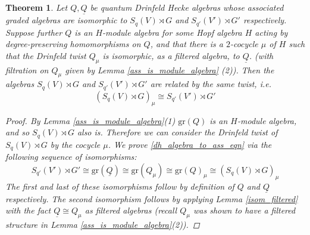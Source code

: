 \documentclass[10pt]{article}
\newcommand{\bb}{\medbreak}
\newcommand{\gr}{\text{gr}}
\newtheorem{theorem}[lemma]{Theorem}
\theoremstyle{definition}
\begin{document}
\begin{theorem}\label{dh_algebra_to_ass} Let $Q,\underline{Q}$ be quantum Drinfeld Hecke algebras whose associated graded algebras are isomorphic to $S_q(V)\rtimes G$ and $S_{q'}(V')\rtimes G'$ respectively. Suppose further $Q$ is an $H$-module algebra for some Hopf algebra $H$ acting by degree-preserving homomorphisms on $Q$, and that there is a $2$-cocycle $\mu$ of $H$ such that the Drinfeld twist $Q_\mu$ is isomorphic, as a filtered algebra, to $\underline{Q}$. (with filtration on $Q_\mu$ given by Lemma \ref{ass_is_module_algebra} (2)). Then the algebras $S_q(V)\rtimes G$ and $S_{q'}(V')\rtimes G'$ are related by the same twist, i.e.
\begin{equation}\label{dh_algebra_to_ass_eqn}(S_q(V)\rtimes G)_\mu\cong S_{q'}(V')\rtimes G'\end{equation}
\begin{proof}
By Lemma \ref{ass_is_module_algebra}(1) $\gr(Q)$ is an $H$-module algebra, and so $S_q(V)\rtimes G$ also is. Therefore we can consider the Drinfeld twist of $S_q(V)\rtimes G$ by the cocycle $\mu$. We prove \eqref{dh_algebra_to_ass_eqn} via the following sequence of isomorphisms:
\begin{equation}\label{chain_isoms}
  S_{q'}(V')\rtimes G'\cong \gr(\underline{Q})\cong \gr(Q_\mu)\cong \gr(Q)_\mu\cong (S_q(V)\rtimes G)_\mu
\end{equation}
The first and last of these isomorphisms follow by definition of $Q$ and $\underline{Q}$ respectively. The second isomorphism follows by applying Lemma \ref{isom_filtered} with the fact $\underline{Q}\cong Q_\mu$ as filtered algebras (recall $Q_\mu$ was shown to have a filtered structure in Lemma \ref{ass_is_module_algebra}(2)).\bb


\end{proof}
\end{theorem}
\end{document}
